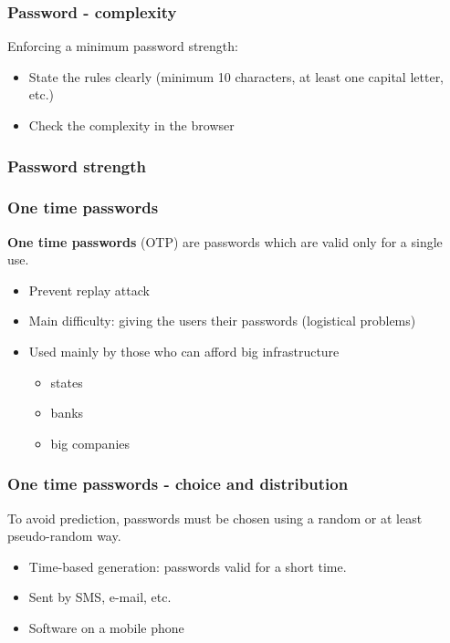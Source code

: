 \begin{frame}
\frametitle{Password - complexity}
Enforcing a minimum password strength:
\begin{itemize}
\item State the rules clearly (minimum 10 characters, at least one capital
letter, etc.)
\item Check the complexity in the browser
\end{itemize}
\end{frame}

\begin{frame}
\frametitle{Password strength}
\end{frame}

\begin{frame}
\frametitle{One time passwords}
\textbf{One time passwords} (OTP) are passwords which are valid only for a
single use.
\begin{itemize}
\item Prevent replay attack
\item Main difficulty: giving the users their passwords
	\small{(logistical problems)}
\item Used mainly by those who can afford big infrastructure
	\begin{itemize}
	\item states
	\item banks
	\item big companies
	\end{itemize}
\end{itemize}
\end{frame}

\begin{frame}
\frametitle{One time passwords - choice and distribution}
To avoid prediction, passwords must be chosen using a random or at
least pseudo-random way.
\begin{itemize}
\item Time-based generation: passwords valid for a short time.
\item Sent by SMS, e-mail, etc.
\item Software on a mobile phone
\end{itemize}
\end{frame}


